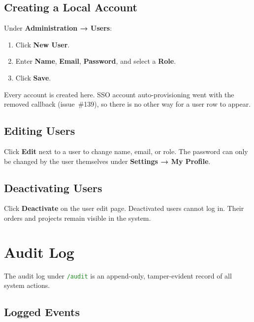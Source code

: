 \documentclass[12pt,a4paper,twoside]{report}
\newcommand{\route}[1]{\texttt{\textcolor{ForestGreen}{#1}}}
\begin{document}
\section{Creating a Local Account}

Under \textbf{Administration → Users}:

\begin{enumerate}
  \item Click \textbf{New User}.
  \item Enter \textbf{Name}, \textbf{Email}, \textbf{Password}, and
        select a \textbf{Role}.
  \item Click \textbf{Save}.
\end{enumerate}

Every account is created here. SSO account auto-provisioning went with the
removed callback (issue~\#139), so there is no other way for a user row to
appear.

\section{Editing Users}

Click \textbf{Edit} next to a user to change name, email, or role.
The password can only be changed by the user themselves under
\textbf{Settings → My Profile}.

\section{Deactivating Users}

Click \textbf{Deactivate} on the user edit page. Deactivated users
cannot log in. Their orders and projects remain visible in the system.

\chapter{Audit Log}
\label{ch:audit}

The audit log under \route{/audit} is an append-only, tamper-evident
record of all system actions.

\section{Logged Events}
\end{document}
